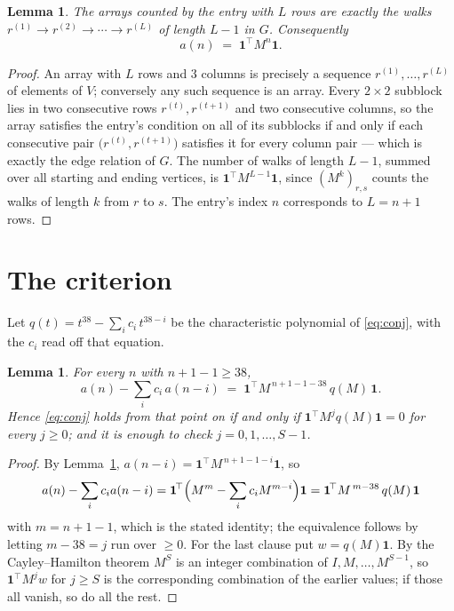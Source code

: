\documentclass[11pt,a4paper]{article}
\theoremstyle{plain}
\newtheorem{lemma}[theorem]{Lemma}
\theoremstyle{definition}
\begin{document}
\begin{lemma}\label{lem:walk}
The arrays counted by the entry with $L$ rows are exactly the walks
$r^{(1)}\to r^{(2)}\to\cdots\to r^{(L)}$ of length $L-1$ in $G$. Consequently
\[
a(n)\;=\;\mathbf{1}^{\!\top}M^{n}\mathbf{1} .
\]
\end{lemma}

\begin{proof}
An array with $L$ rows and $3$ columns is precisely a sequence
$r^{(1)},\dots,r^{(L)}$ of elements of $V$; conversely any such sequence is an array.
Every $2\times2$ subblock lies in two consecutive rows $r^{(t)},r^{(t+1)}$ and two
consecutive columns, so the array satisfies the entry's condition on all of its subblocks
if and only if each consecutive pair $\bigl(r^{(t)},r^{(t+1)}\bigr)$ satisfies it for
every column pair --- which is exactly the edge relation of $G$. The number of walks of
length $L-1$, summed over all starting and ending vertices, is
$\mathbf{1}^{\!\top}M^{L-1}\mathbf{1}$, since $(M^{k})_{r,s}$ counts the walks of
length $k$ from $r$ to $s$. The entry's index $n$ corresponds to $L=n+1$ rows.
\end{proof}

\section{The criterion}

Let $q(t)=t^{38}-\sum_i c_i\,t^{38-i}$ be the characteristic polynomial of
\eqref{eq:conj}, with the $c_i$ read off that equation.

\begin{lemma}\label{lem:crit}
For every $n$ with $n+1-1\ge38$,
\[
a(n)-\sum_i c_i\,a(n-i)\;=\;\mathbf{1}^{\!\top}M^{\,n+1-1-38}\,q(M)\,\mathbf{1} .
\]
Hence \eqref{eq:conj} holds from that point on if and only if
$\mathbf{1}^{\!\top}M^{j}q(M)\mathbf{1}=0$ for every $j\ge0$; and it is enough to check
$j=0,1,\dots,S-1$.
\end{lemma}

\begin{proof}
By Lemma~\ref{lem:walk}, $a(n-i)=\mathbf{1}^{\!\top}M^{\,n+1-1-i}\mathbf{1}$, so
\[
a(n)-\sum_i c_i a(n-i)
=\mathbf{1}^{\!\top}\Bigl(M^{m}-\sum_i c_i M^{m-i}\Bigr)\mathbf{1}
=\mathbf{1}^{\!\top}M^{\,m-38}\,q(M)\,\mathbf{1}
\]
with $m=n+1-1$, which is the stated identity; the equivalence follows by letting
$m-38=j$ run over $\ge0$. For the last clause put $w=q(M)\mathbf{1}$. By the
Cayley--Hamilton theorem $M^{S}$ is an integer combination of $I,M,\dots,M^{S-1}$, so
$\mathbf{1}^{\!\top}M^{j}w$ for $j\ge S$ is the corresponding combination of the earlier
values; if those all vanish, so do all the rest.
\end{proof}
\end{document}

